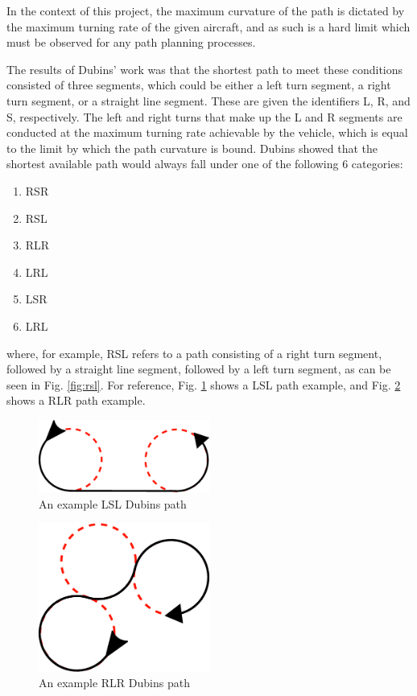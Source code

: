 In the context of this project, the maximum curvature of the path is dictated by the maximum turning rate of the given aircraft, and as such is a hard limit which must be observed for any path planning processes.

The results of Dubins' work was that the shortest path to meet these conditions consisted of three segments, which could be either a left turn segment, a right turn segment, or a straight line segment. These are given the identifiers L, R, and S, respectively. The left and right turns that make up the L and R segments are conducted at the maximum turning rate achievable by the vehicle, which is equal to the limit by which the path curvature is bound. Dubins showed that the shortest available path would always fall under one of the following 6 categories:
\begin{enumerate}
	\item RSR
	\item RSL
	\item RLR
	\item LRL
	\item LSR
	\item LRL
\end{enumerate}

where, for example, RSL refers to a path consisting of a right turn segment, followed by a straight line segment, followed by a left turn segment, as can be seen in Fig. \ref{fig:rsl}. For reference, Fig. \ref{fig:lsl} shows a LSL path example, and Fig. \ref{fig:rlr} shows a RLR path example. 

\begin{figure}[htbp!] 
\centering    
\includegraphics[width=0.5\textwidth]{LSL}
\caption[Dubins LSL path]{An example LSL Dubins path}
\label{fig:lsl}
\end{figure}

\begin{figure}[htbp!] 
\centering    
\includegraphics[width=0.5\textwidth]{RLR}
\caption[Dubins RLR path]{An example RLR Dubins path}
\label{fig:rlr}
\end{figure}


